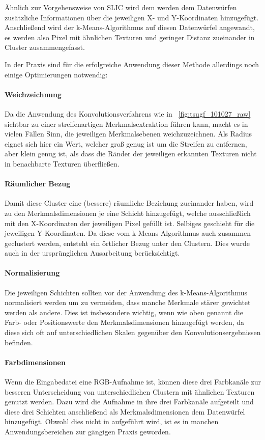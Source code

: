 Ähnlich zur Vorgehensweise von SLIC wird dem werden dem Datenwürfen zusätzliche Informationen über die jeweiligen X- und Y-Koordinaten hinzugefügt. Anschließend wird der k-Means-Algorithmus auf diesen Datenwürfel angewandt, es werden also Pixel mit ähnlichen Texturen und geringer Distanz zueinander in Cluster zusammengefasst.

In der Praxis sind für die erfolgreiche Anwendung dieser Methode allerdings noch einige Optimierungen notwendig: \cite{mathworks_15}

\paragraph{Weichzeichnung}
Da die Anwendung des Konvolutionsverfahrens wie in \figurename~\ref{fig:tsugf_101027_raw} sichtbar zu einer streifenartigen Merkmalsextraktion führen kann, macht es in vielen Fällen Sinn, die jeweiligen Merkmalsebenen weichzuzeichnen. Als Radius eignet sich hier ein Wert, welcher groß genug ist um die Streifen zu entfernen, aber klein genug ist, als dass die Ränder der jeweiligen erkannten Texturen nicht in benachbarte Texturen überfließen.
\paragraph{Räumlicher Bezug}
Damit diese Cluster eine (bessere) räumliche Beziehung zueinander haben, wird zu den Merkmalsdimensionen je eine Schicht hinzugefügt, welche ausschließlich mit den X-Koordinaten der jeweiligen Pixel gefüllt ist. Selbiges geschieht für die jeweiligen Y-Koordinaten. Da diese vom k-Means Algorithmus auch zusammen geclustert werden, entsteht ein örtlicher Bezug unter den Clustern. Dies wurde auch in der ursprünglichen Ausarbeitung \cite{jain_91} berücksichtigt.
\paragraph{Normalisierung}
Die jeweiligen Schichten sollten vor der Anwendung des k-Means-Algorithmus normalisiert werden um zu vermeiden, dass manche Merkmale stärer gewichtet werden als andere. Dies ist insbesondere wichtig, wenn wie oben genannt die Farb- oder Positionswerte den Merkmalsdimensionen hinzugefügt werden, da diese sich oft auf unterschiedlichen Skalen gegenüber den Konvolutionsergebnissen befinden.
\paragraph{Farbdimensionen}
Wenn die Eingabedatei eine RGB-Aufnahme ist, können diese drei Farbkanäle zur besseren Unterscheidung von unterschiedlichen Clustern mit ähnlichen Texturen genutzt werden. Dazu wird die Aufnahme in ihre drei Farbkanäle aufgeteilt und diese drei Schichten anschließend als Merkmalsdimensionen dem Datenwürfel hinzugefügt. Obwohl dies nicht in \cite{jain_91} aufgeführt wird, ist es in manchen Anwendungsbereichen zur gängigen Praxis geworden.

